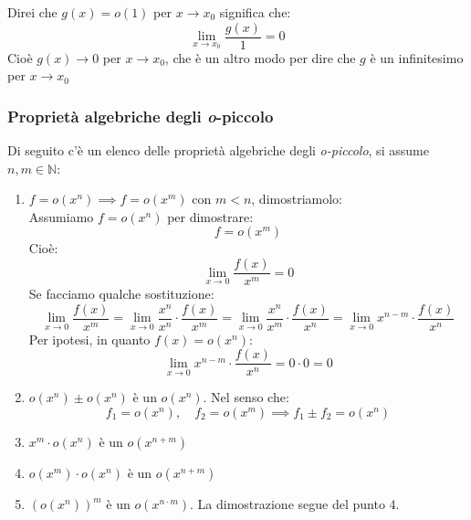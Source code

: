 Direi che $g(x) = o(1)$ per $x \to x_0$ significa che:
\begin{equation*}
	\lim_{x \to x_0} \dfrac{g(x)}{1} = 0
\end{equation*}
Cioè $g(x) \to 0$ per $x \to x_0$, che è un altro modo per dire che $g$ è un infinitesimo per $x \to x_0$

\subsubsection{Proprietà algebriche degli \textit{o}-piccolo}
Di seguito c'è un elenco delle proprietà algebriche degli \textit{o-piccolo}, si assume $n, m \in \mathbb{N}$:
\begin{enumerate}
	\item $f = o(x^n) \implies f= o(x^m)$ con $m < n$, dimostriamolo:\\

		Assumiamo $f = o(x^n)$ per dimostrare:
		\begin{equation*}
			f = o(x^m)
		\end{equation*}
		Cioè:
		\begin{equation*}
			\lim_{x \to 0} \dfrac{f(x)}{x^m} = 0
		\end{equation*}
		Se facciamo qualche sostituzione:
		\begin{equation*}
			\lim_{x \to 0} \dfrac{f(x)}{x^m} = \lim_{x \to 0} \dfrac{x^n}{x^n} \cdot \dfrac{f(x)}{x^m} = \lim_{x \to 0} \dfrac{x^n}{x^m} \cdot \dfrac{f(x)}{x^n} = \lim_{x \to 0} x^{n-m} \cdot \dfrac{f(x)}{x^n}
		\end{equation*}
		Per ipotesi, in quanto $f(x) = o(x^n)$:
		\begin{equation*}
			\lim_{x \to 0} x^{n-m} \cdot \dfrac{f(x)}{x^n} = 0 \cdot 0 = 0
		\end{equation*}

	\item $o(x^n) \pm o(x^n)$ è un $o(x^n)$. Nel senso che:
		\begin{equation*}
			f_1 = o(x^n), \quad f_2 = o(x^m) \implies f_1 \pm f_2 = o(x^n)
		\end{equation*}

	\item $x^m \cdot o(x^n)$ è un $o(x^{n+m})$

	\item $o(x^m) \cdot o(x^n)$ è un $o(x^{n+m})$

	\item $(o(x^n))^m$ è un $o(x^{n \cdot m})$. La dimostrazione segue del punto 4.


\end{enumerate}
